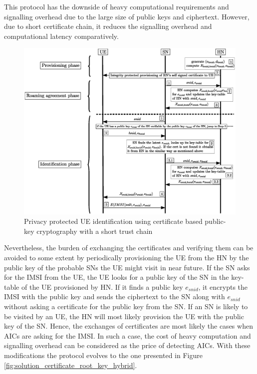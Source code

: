 \documentclass[lnicst,sechang,a4paper]{svmultln}
\begin{document}
This protocol has the downside of heavy computational requirements and signalling overhead due to the large size of public keys and ciphertext. However, due to short certificate chain, it reduces the signalling overhead and computational latency comparatively.

\begin{figure}
\begin{center}
  \includegraphics[width=.98\textwidth]{root-key2.eps}
\caption{Privacy protected UE identification using certificate based public-key cryptography with a short trust chain}
\label{fig:solution_certificate_short_chain}       %
\end{center}
\end{figure}

Nevertheless, the burden of exchanging the certificates and verifying them can be avoided to some extent by periodically provisioning the UE from the HN by the public key of the probable SNs the UE might visit in near future. If the SN asks for the IMSI from the UE, the UE looks for a public key of the SN in the key-table of the UE provisioned by HN. If it finds a public key $e_{snid}$, it encrypts the IMSI with the public key and sends the ciphertext to the SN along with $e_{snid}$ without asking a certificate for the public key from the SN. If an SN is likely to be visited by an UE, the HN will most likely provision the UE with the public key of the SN. Hence, the exchanges of certificates are most likely the cases when AICs are asking for the IMSI. In such a case, the cost of heavy computation and signalling overhead can be considered as the price of detecting AICs. With these modifications the protocol evolves to the one presented in Figure \ref{fig:solution_certificate_root_key_hybrid}. 
\end{document}
